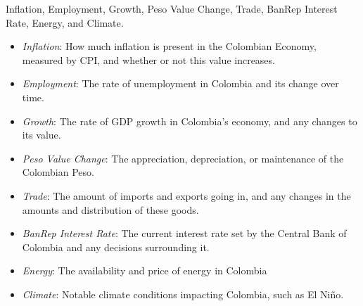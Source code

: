  Inflation, Employment, Growth, Peso Value Change, Trade, BanRep Interest Rate, Energy, and Climate.

\begin{itemize}
    \item \emph{Inflation}: How much inflation is present in the Colombian Economy, measured by CPI, and whether or not this value increases.
    \item \emph{Employment}: The rate of unemployment in Colombia and its change over time.
    \item \emph{Growth}: The rate of GDP growth in Colombia's economy, and any changes to its value.
    \item \emph{Peso Value Change}: The appreciation, depreciation, or maintenance of the Colombian Peso.
    \item \emph{Trade}: The amount of imports and exports going in, and any changes in the amounts and distribution of these goods.
    \item \emph{BanRep Interest Rate}: The current interest rate set by the Central Bank of Colombia and any decisions surrounding it.
    \item \emph{Energy}: The availability and price of energy in Colombia
    \item \emph{Climate}: Notable climate conditions impacting Colombia, such as El Ni\~no.
\end{itemize}


